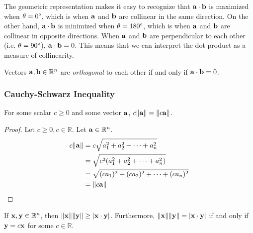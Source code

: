 \documentclass[../main.tex]{subfiles}
\begin{document}
The geometric representation makes it easy to recognize that
$\mathbf{a}\cdot\mathbf{b}$ is maximized when $\theta=0\degree$, which is
when $\mathbf{a}$ and $\mathbf{b}$ are collinear in the same direction.
On the other hand, $\mathbf{a}\cdot\mathbf{b}$ is minimized when $\theta=180\degree$,
which is when $\mathbf{a}$ and $\mathbf{b}$ are collinear in opposite directions.
When $\mathbf{a}$ and $\mathbf{b}$ are perpendicular to each other (i.e. $\theta=90\degree$),
$\mathbf{a}\cdot\mathbf{b}=0$. This means that we can interpret the dot product as a measure
of collinearity.

\begin{definition}[Orthogonal]
	Vectors $\mathbf{a}, \mathbf{b} \in \mathbb{R}^n$ are \textit{orthogonal} to each other if and only if $\mathbf{a}\cdot\mathbf{b}=0$.
\end{definition}

\subsubsection{Cauchy-Schwarz Inequality}

\begin{lemma}
	For some scalar $c \geq 0$ and some vector $\mathbf{a}$, $c\|\mathbf{a}\|=\|c\mathbf{a}\|$.
\end{lemma}

\begin{proof}
	Let $c \geq 0, c \in \mathbb{R}$. Let $\mathbf{a} \in \mathbb{R}^n$.
	\begin{align*}
		c\|\mathbf{a}\| & = c\sqrt{a_1^2+a_2^2+\dots +a_n^2}         \\
		              & = \sqrt{c^2(a_1^2+a_2^2+\dots +a_n^2)}     \\
		              & = \sqrt{(ca_1)^2+(ca_2)^2+\dots +(ca_n)^2} \\
		              & = \|c\mathbf{a}\|
	\end{align*}
\end{proof}

\begin{theorem} \label{cauchy_schwarz}
	If $\mathbf{x}, \mathbf{y} \in \mathbb{R}^n$, then
	$\|\mathbf{x}\|\|\mathbf{y}\| \geq |\mathbf{x}\cdot\mathbf{y}|$. Furthermore,
	$\|\mathbf{x}\|\|\mathbf{y}\|=|\mathbf{x}\cdot\mathbf{y}|$ if and only if $\mathbf{y}=c\mathbf{x}$
	for some $c \in \mathbb{R}$.
\end{theorem}
\end{document}
